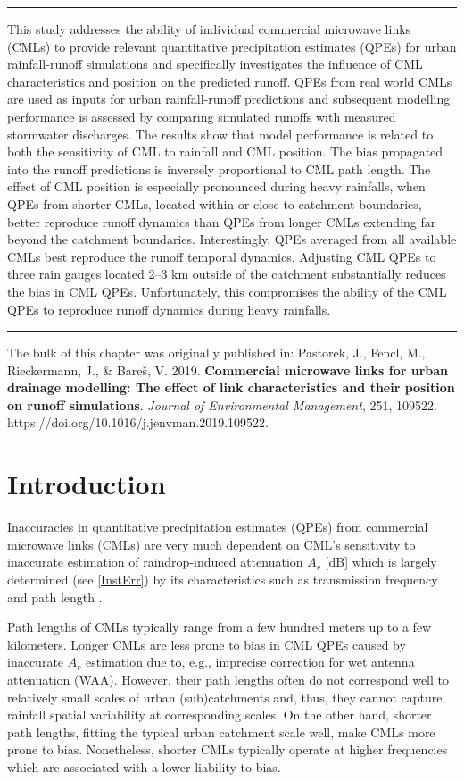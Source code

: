 \documentclass{ctuthesis}\usepackage[]{graphicx}\usepackage[]{color}
\begin{document}
\rule{\textwidth}{0.4pt}
This study addresses the ability of individual commercial microwave links (CMLs) to provide relevant quantitative precipitation estimates (QPEs) for urban rainfall-runoff simulations and specifically investigates the influence of CML characteristics and position on the predicted runoff. QPEs from real world CMLs are used as inputs for urban rainfall-runoff predictions and subsequent modelling performance is assessed by comparing simulated runoffs with measured stormwater discharges. The results show that model performance is related to both the sensitivity of CML to rainfall and CML position. The bias propagated into the runoff predictions is inversely proportional to CML path length. The effect of CML position is especially pronounced during heavy rainfalls, when QPEs from shorter CMLs, located within or close to catchment boundaries, better reproduce runoff dynamics than QPEs from longer CMLs extending far beyond the catchment boundaries. Interestingly, QPEs averaged from all available CMLs best reproduce the runoff temporal dynamics. Adjusting CML QPEs to three rain gauges located 2--3 km outside of the catchment substantially reduces the bias in CML QPEs. Unfortunately, this compromises the ability of the CML QPEs to reproduce runoff dynamics during heavy rainfalls.
\rule[0.2cm]{\textwidth}{0.4pt}

{\footnotesize The bulk of this chapter was originally published in:  \newline
\-\hspace{0.5cm}
Pastorek, J., Fencl, M., Rieckermann, J., \& Bareš, V. 2019.  \textbf{Commercial microwave links for urban drainage modelling: The effect of link characteristics and their position on runoff simulations}. \emph{Journal of Environmental Management}, 251, 109522. https://doi.org/10.1016/j.jenvman.2019.109522.
}

\section{Introduction}

Inaccuracies in quantitative precipitation estimates (QPEs) from commercial microwave links (CMLs) are very much dependent on CML's sensitivity to inaccurate estimation of raindrop-induced attenuation $A_r$ [dB] which is largely determined (see \ref{InstErr}) by its characteristics such as transmission frequency and path length \citep{leijnseMicrowaveLinkRainfall2008}.
       
Path lengths of CMLs typically range from a few hundred meters up to a few kilometers. Longer CMLs are less prone to bias in CML QPEs caused by inaccurate $A_r$ estimation due to, e.g., imprecise correction for wet antenna attenuation (WAA). However, their path lengths often do not correspond well to relatively small scales of urban (sub)catchments and, thus, they cannot capture rainfall spatial variability at corresponding scales. On the other hand, shorter path lengths, fitting the typical urban catchment scale well, make CMLs more prone to bias. Nonetheless, shorter CMLs typically operate at higher frequencies which are associated with a lower liability to bias. 
\end{document}
